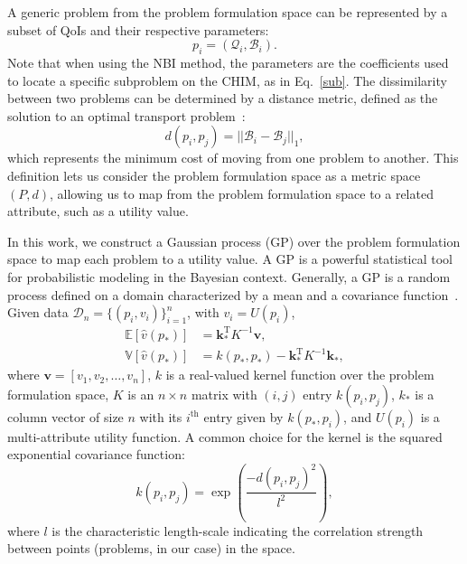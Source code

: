 \documentclass[final,5p,times,twocolumn]{elsarticle}
\begin{document}
A generic problem from the problem formulation space can be represented by a subset of QoIs and their respective parameters:
\begin{equation}
    p_i = (\mathcal{Q}_i,\mathcal{B}_i).
\end{equation}
Note that when using the NBI method, the parameters are the coefficients used to locate a specific subproblem on the CHIM, as in Eq.~\ref{sub}. The dissimilarity between two problems can be determined by a distance metric, defined as the solution to an optimal transport problem~\cite{vershik2013long,villani2009optimal}:
\begin{equation}
    d(p_i,p_j) = ||\mathcal{B}_i-\mathcal{B}_j||_1,
\end{equation}
which represents the minimum cost of moving from one problem to another. This definition lets us consider the problem formulation space as a metric space $(P,d)$, allowing us to map from the problem formulation space to a related attribute, such as a utility value.

In this work, we construct a Gaussian process (GP) over the problem formulation space to map each problem to a utility value. A GP is a powerful statistical tool for probabilistic modeling in the Bayesian context. Generally, a GP is a random process defined on a domain characterized by a mean and a covariance function~\cite{Wagner2023SemiAutonomousPF}. Given data $\mathcal{D}_n=\{(p_i,v_i)\}_{i=1}^n$, with $v_i=U(p_i)$,
\begin{equation}
\label{GP}
\begin{aligned}
\mathbb{E}[\hat{v}(p_*)] &= \mathbf{k}_*^\textrm{T}K^{-1} \mathbf{v},\\
\mathbb{V}[\hat{v}(p_*)]  &=  k(p_*,p_*) - \mathbf{k}_*^\textrm{T}K^{-1} \mathbf{k}_*,
\end{aligned}
\end{equation}
where $\mathbf{v}=[v_1,v_2,\dots,v_n]$, $k$ is a real-valued kernel function over the problem formulation space, $K$ is an $n \times n$ matrix with $(i,j)$ entry $k(p_i,p_j)$, $k_*$ is a column vector of size $n$ with its $i^\textrm{th}$ entry given by $k(p_*,p_i)$, and $U(p_i)$ is a multi-attribute utility function. A common choice for the kernel is the squared exponential covariance function:
\begin{equation}
\label{kernel}
k(p_i,p_j) = \exp\left(\frac{-d(p_i,p_j)^2}{l^2}\right),
\end{equation}
where $l$ is the characteristic length-scale indicating the correlation strength between points (problems, in our case) in the space.
\end{document}
